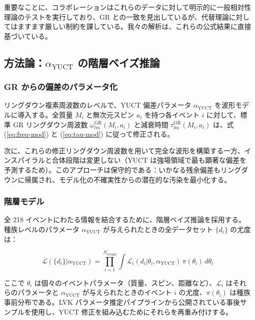 \documentclass[11pt,a4paper]{article}
\theoremstyle{remark}
\begin{document}
	重要なことに、コラボレーションはこれらのデータに対して明示的に一般相対性理論のテストを実行しており、GR との一致を見出しているが、代替理論に対してはますます厳しい制約を課している。我々の解析は、これらの公式結果に直接基づいている。
	
	\subsection{方法論：$\alpha_{\text{YUCT}}$ の階層ベイズ推論}
	
	\subsubsection{GR からの偏差のパラメータ化}
	
	リングダウン複素周波数のレベルで、YUCT 偏差パラメータ $\alpha_{\text{YUCT}}$ を波形モデルに導入する。全質量 $M_i$ と無次元スピン $a_i$ を持つ各イベント $i$ に対して、標準 GR リングダウン周波数 $\omega_{lm}^{\text{GR}}(M_i, a_i)$ と減衰時間 $\tau_{lm}^{\text{GR}}(M_i, a_i)$ は、式 (\ref{eq:freq-mod}) と (\ref{eq:tau-mod}) に従って修正される。
	
	次に、これらの修正リングダウン周波数を用いて完全な波形を構築する一方、インスパイラルと合体段階は変更しない（YUCT は強場領域で最も顕著な偏差を予測するため）。このアプローチは保守的である：いかなる残余偏差もリングダウンに帰属され、モデル化の不確実性からの潜在的な汚染を最小化する。
	
	\subsubsection{階層モデル}
	
	全 218 イベントにわたる情報を結合するために、階層ベイズ推論を採用する。種族レベルのパラメータ $\alpha_{\text{YUCT}}$ が与えられたときの全データセット $\{d_i\}$ の尤度は：
	
	\begin{equation}
		\mathcal{L}(\{d_i\} | \alpha_{\text{YUCT}}) = \prod_{i=1}^{N_{\text{events}}} \int \mathcal{L}_i(d_i | \theta_i, \alpha_{\text{YUCT}}) \, \pi(\theta_i) \, d\theta_i
		\label{eq:hierarchical}
	\end{equation}
	
	ここで $\theta_i$ は個々のイベントパラメータ（質量、スピン、距離など）、$\mathcal{L}_i$ はそれらのパラメータと $\alpha_{\text{YUCT}}$ が与えられたときのイベント $i$ の尤度、$\pi(\theta_i)$ は種族事前分布である。LVK パラメータ推定パイプラインから公開されている事後サンプルを使用し、YUCT 修正を組み込むためにそれらを再重み付けする。
	
\end{document}

